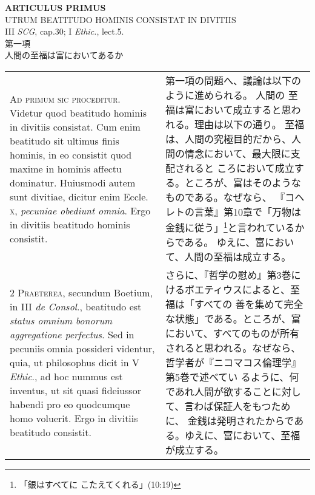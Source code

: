 \documentclass[10pt]{jsarticle} %
\begin{document}
\newpage
{}
\begin{center}
 {\Large {\bf ARTICULUS PRIMUS}}\\
 {\large UTRUM BEATITUDO HOMINIS CONSISTAT IN DIVITIIS}\\
 {\footnotesize III {\itshape SCG}, cap.30; I {\itshape Ethic.}, lect.5.}\\
 {\Large 第一項\\人間の至福は富においてあるか}
\end{center}

\begin{longtable}{p{21em}p{21em}}
{\scshape  Ad primum sic proceditur}. Videtur quod
 beatitudo hominis in divitiis consistat. Cum enim beatitudo sit ultimus
 finis hominis, in eo consistit quod maxime in hominis affectu
 dominatur. Huiusmodi autem sunt divitiae, dicitur enim Eccle. {\scshape x},
 {\itshape pecuniae obediunt omnia}. Ergo in divitiis beatitudo hominis consistit.

 
&

 第一項の問題へ、議論は以下のように進められる。
 人間の 至福は富において成立すると思われる。理由は以下の通り。
 至福は、人間の究極目的だから、人間の情念において、最大限に支配されると
 ころにおいて成立する。ところが、富はそのようなものである。なぜなら、
 『コヘレトの言葉』第10章で「万物は金銭に従う」\footnote{「銀はすべてに
 こたえてくれる」(10:19)}と言われているからである。
 ゆえに、富において、人間の至福は成立する。

\\




{\scshape 2 Praeterea}, secundum Boetium, in III {\itshape de
 Consol}., beatitudo est {\itshape status omnium bonorum aggregatione
 perfectus}. Sed in pecuniis omnia possideri videntur, quia, ut
 philosophus dicit in V {\itshape Ethic}., ad hoc nummus est inventus, ut sit quasi
 fideiussor habendi pro eo quodcumque homo voluerit. Ergo in divitiis
 beatitudo consistit.

 
&

 さらに、『哲学の慰め』第3巻にけるボエティウスによると、至福は「すべての
 善を集めて完全な状態」である。ところが、富において、すべてのものが所有
 されると思われる。なぜなら、哲学者が『ニコマコス倫理学』第5巻で述べてい
 るように、何であれ人間が欲することに対して、言わば保証人をもつために、
 金銭は発明されたからである。ゆえに、富において、至福が成立する。
 
 

\\





\end{longtable}
\end{document}
